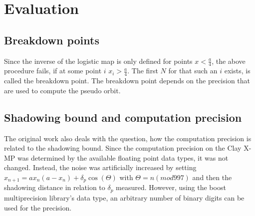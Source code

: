 \section{Evaluation}
  \subsection{Breakdown points}
  Since the inverse of the logistic map is only defined for points $x < \frac{a}{4}$, the above procedure fails, if at some point $i$ $x_i > \frac{a}{4}$. The first $N$ for that such an $i$ exists, is called the breakdown point.
  The breakdown point depends on the precision that are used to compute the pseudo orbit. 
  \subsection{Shadowing bound and computation precision}
  The original work also deals with the question, how the computation precision is related to the shadowing bound. 
  Since the computation precision on the Clay X-MP was determined by the available floating point data types, it was not changed. Instead, the noise was artificially increased by setting $x_{n+1} = ax_n(a-x_n)+\delta_p \cos (\Theta)$ with $\Theta = n (mod 997)$ and then the shadowing distance in relation to $\delta_p$ measured.
  However, using the boost multiprecision library's  data type, an arbitrary number of binary digits can be used for the precision.

